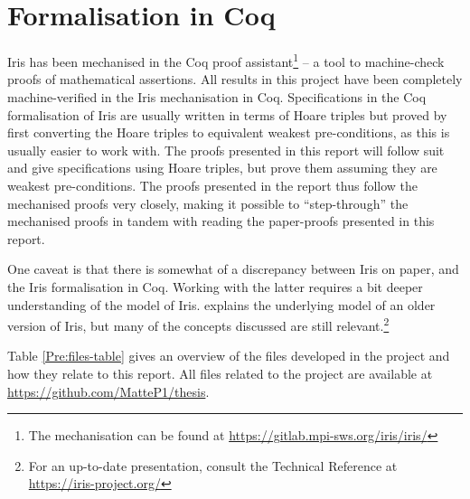 \documentclass[a4paper, 10pt]{report}
\theoremstyle{definition}
\begin{document}
\section{Formalisation in Coq}
\label{Pre:section:coq}

Iris has been mechanised in the Coq proof assistant\footnote{The mechanisation can be found at \url{https://gitlab.mpi-sws.org/iris/iris/}} -- a tool to machine-check proofs of mathematical assertions. All results in this project have been completely machine-verified in the Iris mechanisation in Coq. Specifications in the Coq formalisation of Iris are usually written in terms of Hoare triples but proved by first converting the Hoare triples to equivalent weakest pre-conditions, as this is usually easier to work with. The proofs presented in this report will follow suit and give specifications using Hoare triples, but prove them assuming they are weakest pre-conditions. The proofs presented in the report thus follow the mechanised proofs very closely, making it possible to ``step-through'' the mechanised proofs in tandem with reading the paper-proofs presented in this report.

One caveat is that there is somewhat of a discrepancy between Iris on paper, and the Iris formalisation in Coq. Working with the latter requires a bit deeper understanding of the model of Iris. \citet{DBLP:journals/jfp/JungKJBBD18} explains the underlying model of an older version of Iris, but many of the concepts discussed are still relevant.\footnote{For an up-to-date presentation, consult the Technical Reference at \url{https://iris-project.org/}}

Table \ref{Pre:files-table} gives an overview of the files developed in the project and how they relate to this report. All files related to the project are available at \url{https://github.com/MatteP1/thesis}.
\end{document}
